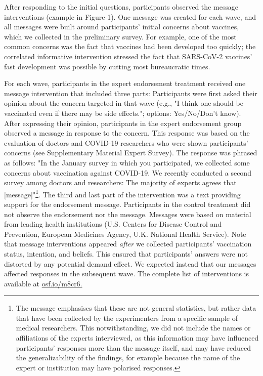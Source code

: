 \documentclass[authordate, empirical]{jote-new-article}
\begin{document}
	After responding to the initial questions, participants observed the message interventions (example in Figure 1). One message was created for each wave, and all messages were built around participants' initial concerns about vaccines, which we collected in the preliminary survey. For example, one of the most common concerns was the fact that vaccines had been developed too quickly; the correlated informative intervention stressed the fact that SARS-CoV-2 vaccines' fast development was possible by cutting most bureaucratic times.



	



	



	For each wave, participants in the expert endorsement treatment received one message intervention that included three parts: Participants were first asked their opinion about the concern targeted in that wave (e.g., "I think one should be vaccinated even if there may be side effects."; options: Yes/No/Don't know). After expressing their opinion, participants in the expert endorsement group observed a message in response to the concern. This response was based on the evaluation of doctors and COVID-19 researchers who were shown participants' concerns (see Supplementary Material Expert Survey). The response was phrased as follows: "In the January survey in which you participated, we collected some concerns about vaccination against COVID-19. We recently conducted a second survey among doctors and researchers: The majority of experts agrees that [message]"\footnote{ The message emphasises that these are not general statistics, but rather data that have been collected by the experimenters from a specific sample of medical researchers. This notwithstanding, we did not include the names or affiliations of the experts interviewed, as this information may have influenced participants' responses more than the message itself, and may have reduced the generalizability of the findings, for example because the name of the expert or institution may have polarised responses.}. The third and last part of the intervention was a text providing support for the endorsement message. Participants in the control treatment did not observe the endorsement nor the message. Messages were based on material from leading health institutions (U.S. Centers for Disease Control and Prevention, European Medicines Agency, U.K. National Health Service). Note that message interventions appeared \emph{after }we collected participants' vaccination status, intention, and beliefs. This ensured that participants' answers were not distorted by any potential demand effect. We expected instead that our messages affected responses in the subsequent wave. The complete list of interventions is available at \href{https://osf.io/m8cr6/}{osf.io/m8cr6.}
\end{document}
